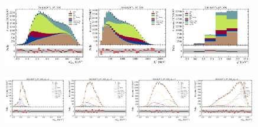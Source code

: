\begin{figure}[!htb]
    \centering
    \includegraphics[width=0.32\textwidth]{./figs-fit-fit-results/ctrl-fit/stacked/fit_result-stacked-D0-2os-mmiss2.pdf}
    \includegraphics[width=0.32\textwidth]{./figs-fit-fit-results/ctrl-fit/stacked/fit_result-stacked-D0-2os-el.pdf}
    \includegraphics[width=0.32\textwidth]{./figs-fit-fit-results/ctrl-fit/stacked/fit_result-stacked-D0-2os-q2.pdf}

    \includegraphics[width=0.24\textwidth]{./figs-fit-fit-results/ctrl-fit/lines_q2_slices/fit_result-lines_q2_idx1-D0-2os-mmiss2.pdf}
    \includegraphics[width=0.24\textwidth]{./figs-fit-fit-results/ctrl-fit/lines_q2_slices/fit_result-lines_q2_idx2-D0-2os-mmiss2.pdf}
    \includegraphics[width=0.24\textwidth]{./figs-fit-fit-results/ctrl-fit/lines_q2_slices/fit_result-lines_q2_idx3-D0-2os-mmiss2.pdf}
    \includegraphics[width=0.24\textwidth]{./figs-fit-fit-results/ctrl-fit/lines_q2_slices/fit_result-lines_q2_idx4-D0-2os-mmiss2.pdf}


\end{figure}
